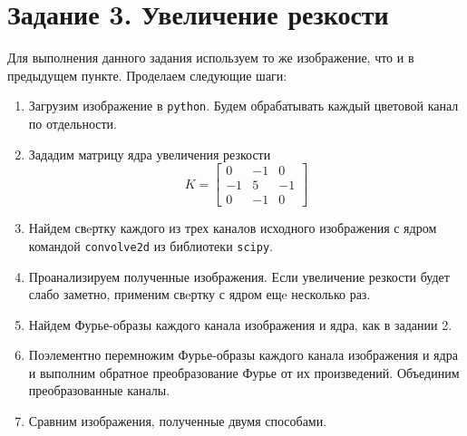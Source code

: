 \documentclass[a4paper, 12pt]{article}
\begin{document}
    \section{Задание 3. Увеличение резкости}
    Для выполнения данного задания используем то же изображение, что и в предыдущем пункте.
    Проделаем следующие шаги:
    \begin{enumerate}
        \item Загрузим изображение в \texttt{python}. Будем обрабатывать каждый цветовой канал по отдельности.
        \item Зададим матрицу ядра увеличения резкости
        $$K=
        \begin{bmatrix}
            0 &-1 &0\\
            -1 &5 &-1\\
            0 &-1 &0
        \end{bmatrix}
        $$
        \item Найдем свeртку каждого из трех каналов исходного изображения с ядром командой \texttt{convolve2d} из библиотеки \texttt{scipy}.
        \item Проанализируем полученные изображения. Если увеличение резкости будет слабо заметно, применим свeртку с ядром ещe несколько раз.
        \item Найдем Фурье-образы каждого канала изображения и ядра, как в задании 2.
        \item Поэлементно перемножим Фурье-образы каждого канала изображения и ядра и выполним обратное преобразование Фурье от их произведений. Объединим преобразованные каналы.
        \item Сравним изображения, полученные двумя способами.
    \end{enumerate}
\end{document}
